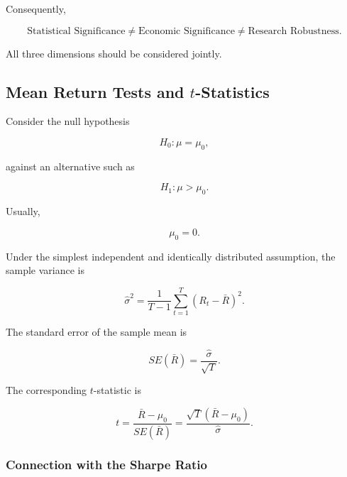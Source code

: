 \documentclass[11pt,a4paper]{article}
\begin{document}
Consequently,

\begin{equation}
\boxed{
\text{Statistical Significance}
\neq
\text{Economic Significance}
\neq
\text{Research Robustness}.
}
\end{equation}

All three dimensions should be considered jointly.


\subsection{Mean Return Tests and $t$-Statistics}
\label{subsec:mean_return_tstats}

Consider the null hypothesis

\begin{equation}
\boxed{
H_0:
\mu
=
\mu_0,
}
\end{equation}

against an alternative such as

\begin{equation}
H_1:
\mu
>
\mu_0.
\end{equation}

Usually,

\begin{equation}
\mu_0=0.
\end{equation}

Under the simplest independent and identically distributed assumption, the
sample variance is

\begin{equation}
\widehat{\sigma}^{2}
=
\frac{1}{T-1}
\sum_{t=1}^{T}
(R_t-\bar{R})^2.
\end{equation}

The standard error of the sample mean is

\begin{equation}
\boxed{
SE(\bar{R})
=
\frac{
\widehat{\sigma}
}{
\sqrt{T}
}.
}
\end{equation}

The corresponding $t$-statistic is

\begin{equation}
\boxed{
t
=
\frac{
\bar{R}-\mu_0
}{
SE(\bar{R})
}
=
\frac{
\sqrt{T}
(\bar{R}-\mu_0)
}{
\widehat{\sigma}
}.
}
\end{equation}


\subsubsection{Connection with the Sharpe Ratio}
\end{document}
